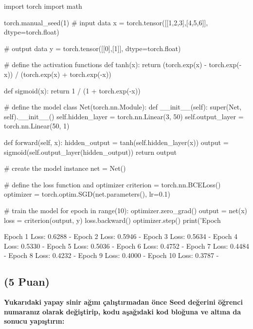\documentclass[11pt]{article}
\begin{document}
\begin{python}
import torch
import math

torch.manual_seed(1)
# input data
x = torch.tensor([[1,2,3],[4,5,6]], dtype=torch.float)

# output data
y = torch.tensor([[0],[1]], dtype=torch.float)

# define the activation functions
def tanh(x):
    return (torch.exp(x) - torch.exp(-x)) / (torch.exp(x) + torch.exp(-x))

def sigmoid(x):
    return 1 / (1 + torch.exp(-x))

# define the model
class Net(torch.nn.Module):
    def __init__(self):
        super(Net, self).__init__()
        self.hidden_layer = torch.nn.Linear(3, 50)
        self.output_layer = torch.nn.Linear(50, 1)
        
    def forward(self, x):
        hidden_output = tanh(self.hidden_layer(x))
        output = sigmoid(self.output_layer(hidden_output))
        return output

# create the model instance
net = Net()

# define the loss function and optimizer
criterion = torch.nn.BCELoss()
optimizer = torch.optim.SGD(net.parameters(), lr=0.1)

# train the model
for epoch in range(10):
    optimizer.zero_grad()
    output = net(x)
    loss = criterion(output, y)
    loss.backward()
    optimizer.step()
    print('Epoch %
\end{python}

Epoch 1 Loss: 0.6288 -
Epoch 2 Loss: 0.5946 -
Epoch 3 Loss: 0.5634 -
Epoch 4 Loss: 0.5330 -
Epoch 5 Loss: 0.5036 - 
Epoch 6 Loss: 0.4752 -
Epoch 7 Loss: 0.4484 - 
Epoch 8 Loss: 0.4232 -
Epoch 9 Loss: 0.4000 -
Epoch 10 Loss: 0.3787 -

\subsection{(5 Puan)} \textbf{Yukarıdaki yapay sinir ağını çalıştırmadan önce Seed değerini öğrenci numaranız olarak değiştirip, kodu aşağıdaki kod bloğuna ve altına da sonucu yapıştırın:}
\end{document}
